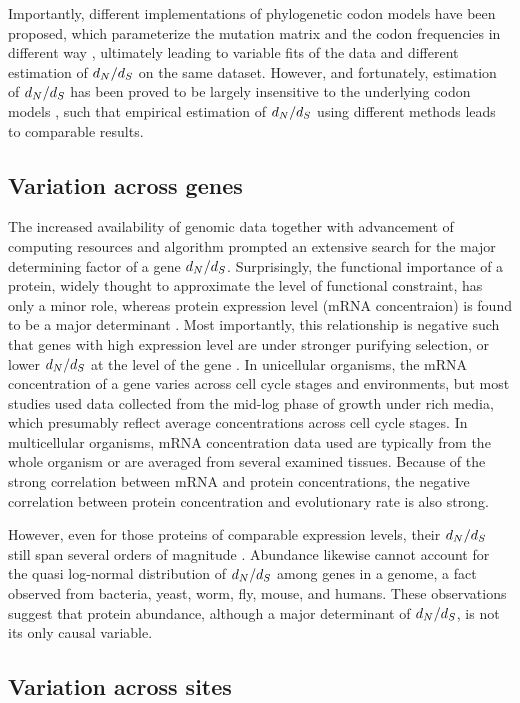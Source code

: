 Importantly, different implementations of phylogenetic codon models have been proposed, which parameterize the mutation matrix and the codon frequencies in different way \cite{Muse1994, Goldman1994}, ultimately leading to variable fits of the data and different estimation of $d_N / d_S$ on the same dataset. 
However, and fortunately, estimation of $d_N / d_S$ has been proved to be largely insensitive to the underlying codon models \citep{Spielman2018}, such that empirical estimation of $d_N / d_S$ using different methods leads to comparable results.

\subsection{Variation across genes}

The increased availability of genomic data together with advancement of computing resources and algorithm prompted an extensive search for the major determining factor of a gene $d_N / d_S$.
Surprisingly, the functional importance of a protein, widely thought to approximate the level of functional constraint, has only a minor role, whereas protein expression level (mRNA concentraion) is found to be a major determinant \citep{Zhang2015}.
Most importantly, this relationship is negative such that genes with high expression level are under stronger purifying selection, or lower $d_N / d_S$ at the level of the gene \citep{Duret2000, Drummond2005a, Zhang2015}.
In unicellular organisms, the mRNA concentration of a gene varies across cell cycle stages and environments, but most studies used data collected from the mid-log phase of growth under rich media, which presumably reflect average concentrations across cell cycle stages.
In multicellular organisms, mRNA concentration data used are typically from the whole organism or are averaged from several examined tissues.
Because of the strong correlation between mRNA and protein concentrations, the negative correlation between protein concentration and evolutionary rate is also strong.

However, even for those proteins of comparable expression levels, their $d_N / d_S$ still span several orders of magnitude \citep{Drummond2008}.
Abundance likewise cannot account for the quasi log-normal distribution of $d_N / d_S$ among genes in a genome, a fact observed from bacteria, yeast, worm, fly, mouse, and humans.
These observations suggest that protein abundance, although a major determinant of $d_N / d_S$, is not its only causal variable.

\subsection{Variation across sites}

